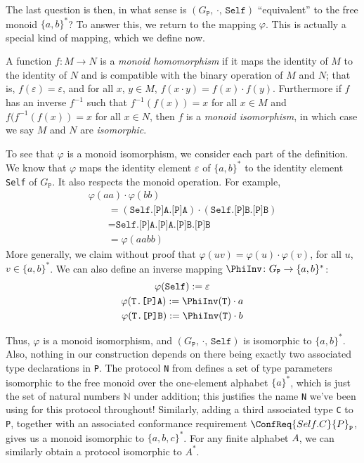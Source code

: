 \documentclass[../generics]{subfiles}
\begin{document}
The last question is then, in what sense is $(G_\texttt{P},\,\cdot,\,\texttt{Self})$ ``equivalent'' to the free monoid $\{a,b\}^*$? To answer this, we return to the mapping $\varphi$. This is actually a special kind of mapping, which we define now.

\begin{definition}
%
%
%
%
A function $f\colon M\rightarrow N$ is a \emph{monoid homomorphism} if it maps the identity of $M$ to the identity of $N$ and is compatible with the binary operation of $M$ and $N$; that is, $f(\varepsilon)=\varepsilon$, and for all $x$, $y\in M$, $f(x\cdot y)=f(x)\cdot f(y)$. Furthermore if $f$ has an inverse $f^{-1}$ such that $f^{-1}(f(x))=x$ for all $x\in M$ and $f(f^{-1}(f(x))=x$ for all $x\in N$, then $f$ is a \emph{monoid isomorphism}, in which case we say $M$ and $N$ are \emph{isomorphic}.
\end{definition}

To see that $\varphi$ is a monoid isomorphism, we consider each part of the definition. We know that $\varphi$ maps the identity element $\varepsilon$ of $\{a,b\}^*$ to the identity element \texttt{Self} of $G_\texttt{P}$. It also respects the monoid operation. For example,
\begin{gather*}
\varphi(aa)\cdot\varphi(bb)\\
\qquad {}=(\texttt{Self.[P]A.[P]A})\cdot(\texttt{Self.[P]B.[P]B})\\
\qquad {}=\texttt{Self.[P]A.[P]A.[P]B.[P]B}\\
\qquad {}=\varphi(aabb)
\end{gather*}
More generally, we claim without proof that $\varphi(uv)=\varphi(u)\cdot\varphi(v)$, for all $u$, $v\in\{a,b\}^*$. We can also define an inverse mapping $\PhiInv\colon G_\texttt{P}\rightarrow\{a,b\}^*$:
\begin{gather*}
\varphi(\texttt{Self}):=\varepsilon\\
\varphi(\texttt{\texttt{T}.[P]A}):=\PhiInv(\texttt{T})\cdot a\\
\varphi(\texttt{\texttt{T}.[P]B}):=\PhiInv(\texttt{T})\cdot b
\end{gather*}

Thus, $\varphi$ is a monoid isomorphism, and $(G_\texttt{P},\,\cdot,\,\texttt{Self})$ is isomorphic to $\{a,b\}^*$. Also, nothing in our construction depends on there being exactly two associated type declarations in \texttt{P}. The protocol \texttt{N} from  defines a set of type parameters isomorphic to the free monoid over the one-element alphabet $\{a\}^*$, which is just the set of natural numbers $\mathbb{N}$ under addition; this justifies the name \texttt{N} we've been using for this protocol throughout! Similarly, adding a third associated type \texttt{C} to \texttt{P}, together with an associated conformance requirement $\ConfReq{Self.C}{P}_\texttt{P}$, gives us a monoid isomorphic to $\{a,b,c\}^*$. For any finite alphabet $A$, we can similarly obtain a protocol isomorphic to $A^*$.
\end{document}
